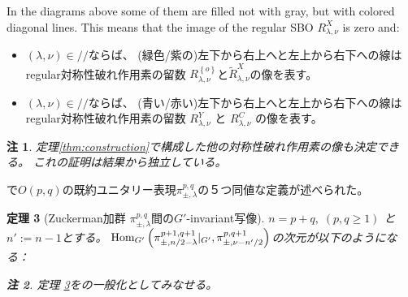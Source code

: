 \documentclass[12pt]{article} %
\newtheorem{theorem}{定理}
\newcommand{\Hom}{\mbox{\normalfont Hom}}
\newtheorem{remark}[theorem]{注}
\theoremstyle{definition}
\theoremstyle{exampstyle} \newtheorem{examp}[theorem]{Theorem}
\renewcommand{\ss}{//}
\begin{document}
	In the diagrams above some of them are filled not with gray, but with colored diagonal lines. This means that the image of the regular SBO $R_{\lambda,\nu}^X$ is zero and:
	\begin{itemize}
		\item $(\lambda,\nu)\in\ss$ならば、
	(緑色/紫の)左下から右上へと左上から右下への線はregular対称性破れ作用素の留数
	$R_{\lambda,\nu}^{ \left\{ o \right\}}$と$\tilde{R}_{\lambda,\nu}^X$の像を表す。
		\item $(\lambda,\nu)\in\ss$ならば、
	(青い/赤い)左下から右上へと左上から右下への線はregular対称性破れ作用素の留数
	$R_{\lambda,\nu}^{Y}$ と ${R}_{\lambda,\nu}^C$ の像を表す。
	\end{itemize}
\begin{remark}
	定理\ref{thm:construction}で構成した他の対称性破れ作用素の像も決定できる。
	これの証明は\cite{howe1993homogeneous}結果から独立している。
\end{remark}

\cite{KO2}で$O(p,q)$の既約ユニタリー表現$\pi_{\pm,\lambda}^{p,q}$の５つ同値な定義が述べられた。
\begin{theorem}[Zuckerman加群 $\pi_{\pm,\lambda}^{p,q}$間の$G'$-invariant写像]\label{thm:Aq}
	$n=p+q,\;(p,q\ge1)$ と $n':=n-1$とする。
	$\Hom_{G'}\left(\pi_{\pm,{n}/{2}-\lambda}^{p+1,q+1}\kern-0.3em\mid_{G'} ,\pi_{\pm,\nu-{n'}/{2}}^{p,q+1} \right)$の次元が以下のようになる：
	\newline
{}\\\vspace{\baselineskip}
\begin{remark}
定理 \ref{thm:Aq}を\cite[Thms. 12.1 and 1.3]{kobayashi2015symmetry}の一般化としてみなせる。
\end{remark}
\end{theorem}
\nocite{kobayashi2015program}
\small


\end{document}
